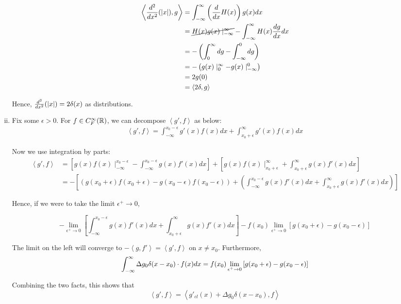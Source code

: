 \documentclass[12pt]{article}%
\newcommand{\disip}[2]{\left\langle #1, #2 \right\rangle}
\begin{document}
\begin{enumerate}[i.]
\begin{align*}
  \disip{\frac{d^2}{dx^2}(\abs{x})}{g} & = \doubinfint \para{\frac{d}{dx} H(x)} g(x) dx \\
  & = \cancel{H(x)g(x)\mid_{-\infty}^{\infty}} - \doubinfint H(x)\frac{dg}{dx} dx \\
  & = - \left(\int_0^{\infty} dg - \int_{-\infty}^0 dg \right) \\
  & = - \para{g(x)\mid_{0}^\infty - g(x)\mid_{-\infty}^0} \\
  & = 2g(0) \\
  & = \disip{2\delta}{g}
\end{align*}

Hence, $\frac{d^2}{dx^2}(\abs{x}) = 2\delta(x)$ as distributions.

\item
Fix some $\epsilon > 0$. For $f \in C_F^{\infty}({\mathbb{R}})$, we can decompose $\disip{g'}{f}$ as below:
\begin{align*}
  \disip{g'}{f} = \int_{-\infty}^{x_0 - \epsilon} g'(x)f(x) dx  + \int_{x_0 + \epsilon}^{\infty} g'(x)f(x) dx
\end{align*}

Now we use integration by parts:
\begin{align*}
\disip{g'}{f} & = \left[g(x)f(x)\mid_{-\infty}^{x_0 - \epsilon} - \int_{-\infty}^{x_0 - \epsilon} g(x)f'(x) dx
 \right] + \left[g(x)f(x)\mid_{x_0 + \epsilon}^{\infty} + \int_{x_0 + \epsilon}^{\infty} g(x)f'(x) dx \right] \\
 & = -\left[ (g(x_0 + \epsilon)f(x_0 + \epsilon) - g(x_0 - \epsilon)f(x_0 - \epsilon)) + \left( \int_{-\infty}^{x_0 - \epsilon} g(x)f'(x) dx + \int_{x_0 + \epsilon}^{\infty} g(x)f'(x) dx\right) \right]
\end{align*}

Hence, if we were to take the limit $\epsilon^+ \rightarrow 0$,

\[-\lim_{\epsilon^+ \rightarrow 0} \left[\int_{-\infty}^{x_0 - \epsilon} g(x)f'(x) dx +\int_{x_0 + \epsilon}^{\infty} g(x)f'(x) dx\right] -  f(x_0)\lim_{\epsilon^+ \rightarrow 0} \left[g(x_0 + \epsilon) - g(x_0 - \epsilon)\right] \]

The limit on the left will converge to $-\disip{g}{f'} = \disip{g'}{f}$ on $x \neq x_0$. Furthermore,
\[\int_{-\infty}^{\infty} \Delta g_0 \delta(x-x_0)\cdot f(x) dx =  f(x_0)\lim_{\epsilon^+ \rightarrow 0} \left[g(x_0 + \epsilon) - g(x_0 - \epsilon)\right] \]

Combining the two facts, this shows that
\[ \disip{g'}{f} = \disip{g'_{cl}(x) + \Delta g_0 \delta(x - x_0)}{f} \]

\end{enumerate}
\end{document}
